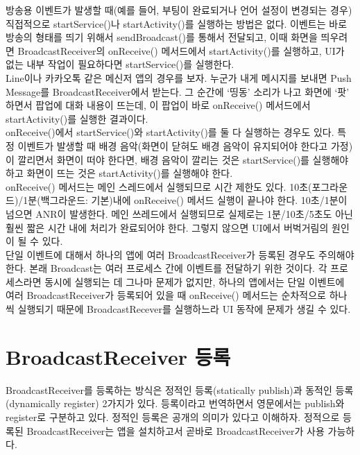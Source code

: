 방송용 이벤트가 발생할 때(예를 들어, 부팅이 완료되거나 언어 설정이 변경되는 경우) 직접적으로 startService()나 startActivity()를 실행하는 방법은 없다. 이벤트는 바로 방송의 형태를 띄기 위해서 sendBroadcast()를 통해서 전달되고, 이때 화면을 띄우려면 BroadcastReceiver의 onReceive() 메서드에서 startActivity()를 실행하고, UI가 없는 내부 작업이 필요하다면 startService()를 실행한다.\\

Line이나 카카오톡 같은 메신저 앱의 경우를 보자. 누군가 내게 메시지를 보내면 Push Message를 BroadcastReceiver에서 받는다. 그 순간에 `띵동' 소리가 나고 화면에 `팟' 하면서 팝업에 대화 내용이 뜨는데, 이 팝업이 바로 onReceive() 메서드에서 startActivity()를 실행한 결과이다.\\

onReceive()에서 startService()와 startActivity()를 둘 다 실행하는 경우도 있다. 특정 이벤트가 발생할 때 배경 음악(화면이 닫혀도 배경 음악이 유지되어야 한다고 가정)이 깔리면서 화면이 떠야 한다면, 배경 음악이 깔리는 것은 startService()를 실행해야 하고 화면이 뜨는 것은 startActivity()를 실행해야 한다.\\

onReceive() 메서드는 메인 스레드에서 실행되므로 시간 제한도 있다.
10초(포그라운드)/1분(백그라운드: 기본)내에 onReceive() 메서드 실행이 끝나야 한다. 10초/1분이 넘으면 ANR이 발생한다.
메인 쓰레드에서 실행되므로 실제로는 1분/10초/5초도 아닌 훨씬 짧은 시간 내에 처리가 완료되어야 한다. 그렇지 않으면 UI에서 버벅거림의 원인이 될 수 있다.\\

단일 이벤트에 대해서 하나의 앱에 여러 BroadcastReceiver가 등록된 경우도 주의해야 한다.
본래 Broadcast는 여러 프로세스 간에 이벤트를 전달하기 위한 것이다. 각 프로세스라면 동시에 실행되는 데 그나마 문제가  없지만, 하나의 앱에서는 단일 이벤트에 여러 BroadcastReceiver가 등록되어 있을 때 onReceive() 메서드는 순차적으로 하나씩 실행되기 때문에 BroadcastRecever를 실행하느라 UI 동작에 문제가 생길 수 있다.

\begin{comment}
어떤 앱에서는 Application에만 registerReceiver를 해놓는 경우도 있다. BroadcastReceiver를 최소한의 개수로 하고, 최소한의 시간만 존재하도록 하는 것이 BroadcastReceiver로 인해 UI가 버벅거리지 않게 하는 방법이다.
\end{comment}

\section{BroadcastReceiver 등록}
BroadcastReceiver를 등록하는 방식은 정적인 등록(statically publish)과 동적인 등록(dynamically register) 2가지가 있다. 등록이라고 번역하면서 영문에서는 publish와 register로 구분하고 있다. 
정적인 등록은 공개의 의미가 있다고 이해하자. 정적으로 등록된 BroadcastReceiver는 앱을 설치하고서 곧바로 BroadcastReceiver가 사용 가능하다.\\

